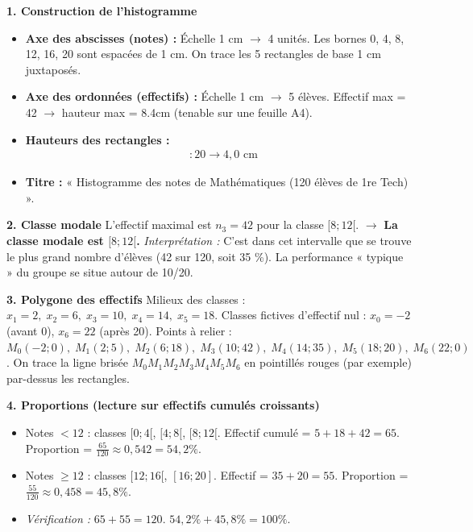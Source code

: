 \documentclass[11pt]{article}
\begin{document}
\begin{exoresolu}
\noindent \textbf{1. Construction de l'histogramme}
\begin{itemize}
    \item \textbf{Axe des abscisses (notes) :} Échelle 1 cm $\rightarrow$ 4 unités. Les bornes 0, 4, 8, 12, 16, 20 sont espacées de 1 cm. On trace les 5 rectangles de base 1 cm juxtaposés.
    \item \textbf{Axe des ordonnées (effectifs) :} Échelle 1 cm $\rightarrow$ 5 élèves. Effectif max = 42 $\rightarrow$ hauteur max = 8.4cm (tenable sur une feuille A4).
    \item \textbf{Hauteurs des rectangles :}
    \begin{align*}
        [0;4[ &: 5 \to 1,0 \text{ cm} \\
        [4;8[ &: 18 \to 3,6 \text{ cm} \\
        [8;12[ &: 42 \to 8,4 \text{ cm} \quad \text{(le plus haut)} \\
        [12;16[ &: 35 \to 7,0 \text{ cm} \\
        [16;20] &: 20 \to 4,0 \text{ cm}
    \end{align*}
    \item \textbf{Titre :} « Histogramme des notes de Mathématiques (120 élèves de 1re Tech) ».
\end{itemize}

\noindent \textbf{2. Classe modale}
L'effectif maximal est $n_3 = 42$ pour la classe $[8 ; 12[$.
$\rightarrow$ \textbf{La classe modale est $[8 ; 12[$.}
\textit{Interprétation :} C'est dans cet intervalle que se trouve le plus grand nombre d'élèves (42 sur 120, soit 35 \%). La performance « typique » du groupe se situe autour de 10/20.

\noindent \textbf{3. Polygone des effectifs}
Milieux des classes : $x_1=2,\; x_2=6,\; x_3=10,\; x_4=14,\; x_5=18$.
Classes fictives d'effectif nul : $x_0 = -2$ (avant 0), $x_6 = 22$ (après 20).
Points à relier : $M_0(-2;0),\; M_1(2;5),\; M_2(6;18),\; M_3(10;42),\; M_4(14;35),\; M_5(18;20),\; M_6(22;0)$.
On trace la ligne brisée $M_0 M_1 M_2 M_3 M_4 M_5 M_6$ en pointillés rouges (par exemple) par-dessus les rectangles.

\noindent \textbf{4. Proportions (lecture sur effectifs cumulés croissants)}
\begin{itemize}
    \item Notes $< 12$ : classes $[0;4[$, $[4;8[$, $[8;12[$. Effectif cumulé = $5 + 18 + 42 = 65$.
    Proportion = $\frac{65}{120} \approx 0,542 = 54,2\%$.
    \item Notes $\ge 12$ : classes $[12;16[$, $[16;20]$. Effectif = $35 + 20 = 55$.
    Proportion = $\frac{55}{120} \approx 0,458 = 45,8\%$.
    \item \textit{Vérification :} $65 + 55 = 120$. $54,2\% + 45,8\% = 100\%$.
\end{itemize}
\end{exoresolu}
\end{document}
